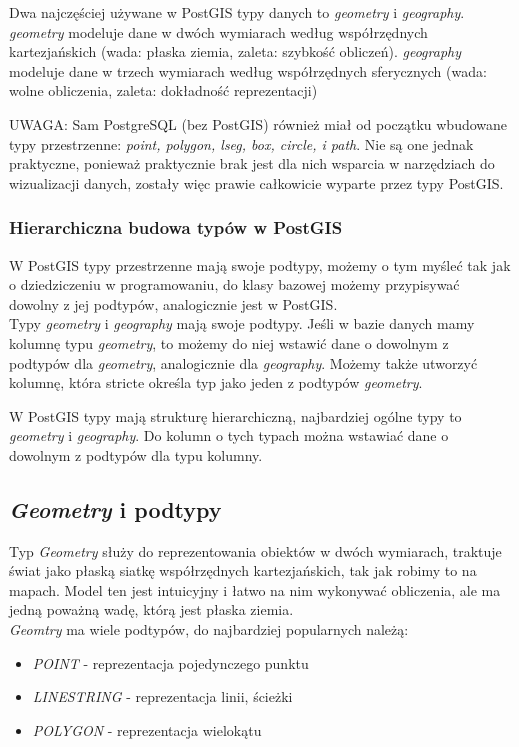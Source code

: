 \documentclass[a4paper,15pt]{article}
\newcommand{\issue}[2]{
    \begin{tcolorbox}[colback=issueColor!5!white,colframe=issueColor,title={Pamiętaj #1}]
        #2
    \end{tcolorbox}
}
\begin{document}
\issue{}{
Dwa najczęściej używane w PostGIS typy danych to \textit{geometry} i \textit{geography}. \textit{geometry} modeluje dane w dwóch wymiarach według współrzędnych kartezjańskich (wada: płaska ziemia, zaleta: szybkość obliczeń). \textit{geography} modeluje dane w trzech wymiarach według współrzędnych sferycznych (wada: wolne obliczenia, zaleta: dokładność reprezentacji) 
}

UWAGA: Sam PostgreSQL (bez PostGIS) również miał od początku wbudowane typy przestrzenne: \textit{point, polygon, lseg, box, circle, i path}. Nie są one jednak praktyczne, ponieważ praktycznie brak jest dla nich wsparcia w narzędziach do wizualizacji danych, zostały więc prawie całkowicie wyparte przez typy PostGIS. 

\subsubsection{Hierarchiczna budowa typów w PostGIS}
W PostGIS typy przestrzenne mają swoje podtypy, możemy o tym myśleć tak jak o dziedziczeniu w programowaniu, do klasy bazowej możemy przypisywać dowolny z jej podtypów, analogicznie jest w PostGIS. \\

Typy \textit{geometry} i \textit{geography} mają swoje podtypy. Jeśli w bazie danych mamy kolumnę typu \textit{geometry}, to możemy do niej wstawić dane o dowolnym z podtypów dla \textit{geometry}, analogicznie dla \textit{geography}. Możemy także utworzyć kolumnę, która stricte określa typ jako jeden z podtypów \textit{geometry}. 

\issue{}{
W PostGIS typy mają strukturę hierarchiczną, najbardziej ogólne typy to \textit{geometry} i \textit{geography}. Do kolumn o tych typach można wstawiać dane o dowolnym z podtypów dla typu kolumny.
} 

\subsection{\textit{Geometry} i podtypy}
Typ \textit{Geometry} służy do reprezentowania obiektów w dwóch wymiarach, traktuje świat jako płaską siatkę współrzędnych kartezjańskich, tak jak robimy to na mapach. Model ten jest intuicyjny i łatwo na nim wykonywać obliczenia, ale ma jedną poważną wadę, którą jest płaska ziemia. \\

\textit{Geomtry} ma wiele podtypów, do najbardziej popularnych należą:
\begin{itemize}
\item \textit{POINT} - reprezentacja pojedynczego punktu
\item \textit{LINESTRING} - reprezentacja linii, ścieżki 
\item \textit{POLYGON} - reprezentacja wielokątu
\end{itemize}
\end{document}
